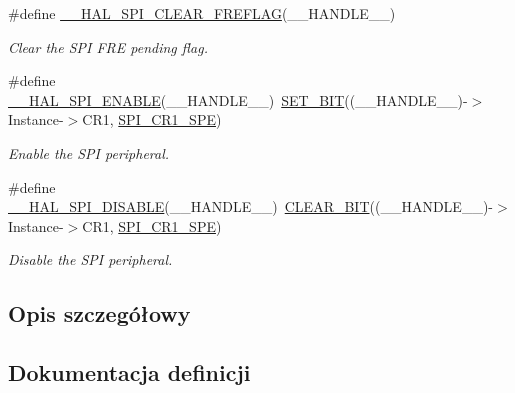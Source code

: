 \begin{DoxyCompactItemize}
\#define \hyperlink{group___s_p_i___exported___macros_ga7ff182f5cf6c731318c882351d6d7ac2}{\+\_\+\+\_\+\+H\+A\+L\+\_\+\+S\+P\+I\+\_\+\+C\+L\+E\+A\+R\+\_\+\+F\+R\+E\+F\+L\+AG}(\+\_\+\+\_\+\+H\+A\+N\+D\+L\+E\+\_\+\+\_\+)
\begin{DoxyCompactList}\small\item\em Clear the S\+PI F\+RE pending flag. \end{DoxyCompactList}\item 
\#define \hyperlink{group___s_p_i___exported___macros_ga16d2d73c2b16004499ae8d492e71fd4e}{\+\_\+\+\_\+\+H\+A\+L\+\_\+\+S\+P\+I\+\_\+\+E\+N\+A\+B\+LE}(\+\_\+\+\_\+\+H\+A\+N\+D\+L\+E\+\_\+\+\_\+)~\hyperlink{group___exported__macro_ga26474f43799fbade9cf300e21dd3a91a}{S\+E\+T\+\_\+\+B\+IT}((\+\_\+\+\_\+\+H\+A\+N\+D\+L\+E\+\_\+\+\_\+)-\/$>$Instance-\/$>$C\+R1, \hyperlink{group___peripheral___registers___bits___definition_gac5a646d978d3b98eb7c6a5d95d75c3f9}{S\+P\+I\+\_\+\+C\+R1\+\_\+\+S\+PE})
\begin{DoxyCompactList}\small\item\em Enable the S\+PI peripheral. \end{DoxyCompactList}\item 
\#define \hyperlink{group___s_p_i___exported___macros_gaa10d88f87d16de53bd81dfb33bd56959}{\+\_\+\+\_\+\+H\+A\+L\+\_\+\+S\+P\+I\+\_\+\+D\+I\+S\+A\+B\+LE}(\+\_\+\+\_\+\+H\+A\+N\+D\+L\+E\+\_\+\+\_\+)~\hyperlink{group___exported__macro_ga133aae6fc0d41bffab39ab223a7001de}{C\+L\+E\+A\+R\+\_\+\+B\+IT}((\+\_\+\+\_\+\+H\+A\+N\+D\+L\+E\+\_\+\+\_\+)-\/$>$Instance-\/$>$C\+R1, \hyperlink{group___peripheral___registers___bits___definition_gac5a646d978d3b98eb7c6a5d95d75c3f9}{S\+P\+I\+\_\+\+C\+R1\+\_\+\+S\+PE})
\begin{DoxyCompactList}\small\item\em Disable the S\+PI peripheral. \end{DoxyCompactList}\end{DoxyCompactItemize}


\subsection{Opis szczegółowy}


\subsection{Dokumentacja definicji}
\mbox{\label{group___s_p_i___exported___macros_gad1cb4100b67726531ad426d300f4cd26}} 
